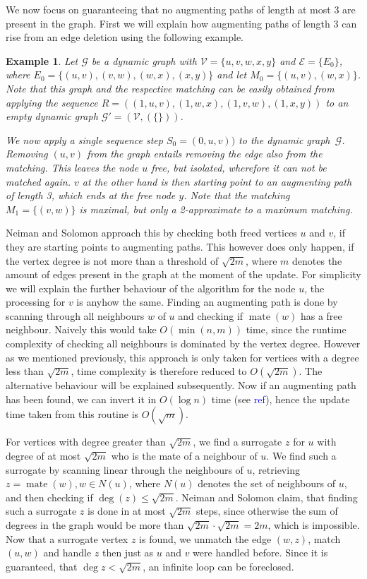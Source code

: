 \documentclass{article}      %
\newcommand\todo[1]{\textcolor{blue}{#1}}
\newtheorem{example}{Example}[subsection]
\DeclareMathOperator\mate{mate}
\begin{document}
We now focus on guaranteeing that no augmenting paths of length at most $3$ are present in the graph. First we will explain how augmenting paths of length $3$ can rise from an edge deletion using the following example.

\begin{example}
\label{ex:rise-aug-path}
Let $\mathcal{G}$ be a dynamic graph with $\mathcal{V}=\{u,v,w,x,y\}$ and $\mathcal{E}=\{E_0\}$, where $E_0=\{(u,v),(v,w),(w,x),(x,y)\}$ and let $M_0=\{(u,v),(w,x)\}$. Note that this graph and the respective matching can be easily obtained from applying the sequence $ R=((1,u,v),(1,w,x),(1,v,w),(1,x,y)) $ to an empty dynamic graph $\mathcal{G'}=(\mathcal{V},(\{\}))$. 

We now apply a single sequence step $S_0 = (0,u,v))$ to the dynamic graph~$\mathcal{G}$. Removing $(u,v)$ from the graph entails removing the edge also from the matching. This leaves the node $u$ free, but isolated, wherefore it can not be matched again. $v$ at the other hand is then starting point to an augmenting path of length 3, which ends at the free node $y$. Note that the matching $M_1=\{(v,w)\}$ is maximal, but only a 2-approximate to a maximum matching.
\end{example}

\noindent
Neiman and Solomon approach this by checking both freed vertices $u$ and $v$, if they are starting points to augmenting paths. This however does only happen, if the vertex degree is not more than a threshold of $\sqrt{2m}$, where $m$ denotes the amount of edges present in the graph at the moment of the update. For simplicity we will explain the further behaviour of the algorithm for the node $u$, the processing for $v$ is anyhow the same. Finding an augmenting path is done by scanning through all neighbours $w$ of $u$ and checking if $\mate(w)$ has a free neighbour. Naively this would take $O(\min(n,m))$ time, since the runtime complexity of checking all neighbours is dominated by the vertex degree. However as we mentioned previously, this approach is only taken for vertices with a degree less than $\sqrt{2m}$, time complexity is therefore reduced to $O(\sqrt{2m})$. The alternative behaviour will be explained subsequently. Now if an augmenting path has been found, we can invert it in $O(\log n)$ time (see \todo{ref}), hence the update time taken from this routine is $O(\sqrt{m})$.

For vertices with degree greater than $\sqrt{2m}$, we find a surrogate $z$ for $u$ with degree of at most $\sqrt{2m}$ who is the mate of a neighbour of $u$. We find such a surrogate by scanning linear through the neighbours of $u$, retrieving $z=\mate(w), w \in N(u)$, where $N(u)$ denotes the set of neighbours of $u$, and then checking if $\deg(z)\leq\sqrt{2m}$. Neiman and Solomon claim, that finding such a surrogate $z$ is done in at most $\sqrt{2m}$ steps, since otherwise the sum of degrees in the graph would be more than $\sqrt{2m} \cdot \sqrt{2m} = 2m$, which is impossible. Now that a surrogate vertex $z$ is found, we unmatch the edge $(w,z)$, match $(u,w)$ and handle $z$ then just as $u$ and $v$ were handled before. Since it is guaranteed, that $\deg{z}<\sqrt{2m}$, an infinite loop can be foreclosed.
\end{document}
